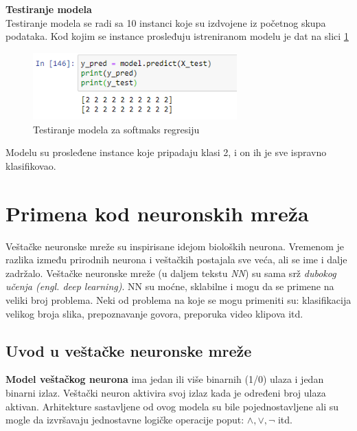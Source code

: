 \documentclass[a4paper,12pt]{report}
\begin{document}
\textbf{Testiranje modela}\\

Testiranje modela se radi sa 10 instanci koje su izdvojene iz početnog skupa podataka. Kod kojim se instance prosleđuju istreniranom modelu je dat na slici \ref{fig:softmaxtest}

\begin{figure}[h]
    \centering
    \includegraphics[width=0.7\textwidth]{softmax_test.png}
    \caption{Testiranje modela za softmaks regresiju}\label{fig:softmaxtest}
\end{figure}

Modelu su prosleđene instance koje pripadaju klasi 2, i on ih je sve ispravno klasifikovao. \\

\chapter{Primena kod neuronskih mreža}

Veštačke neuronske mreže su inspirisane idejom bioloških neurona. Vremenom je razlika između prirodnih neurona i veštačkih postajala sve veća, ali se ime i dalje zadržalo. Veštačke neuronske mreže (u daljem tekstu \textit{NN}) su sama srž \textit{dubokog učenja (engl. deep learning)}. NN su moćne, sklabilne i mogu da se primene na veliki broj problema. Neki od problema na koje se mogu primeniti su: klasifikacija velikog broja slika, prepoznavanje govora, preporuka video klipova itd. 

\section{Uvod u veštačke neuronske mreže}

\textbf{Model veštačkog neurona} ima jedan ili više binarnih (1/0) ulaza i jedan binarni izlaz. Veštački neuron aktivira svoj izlaz kada je određeni broj ulaza aktivan. Arhitekture sastavljene od ovog modela su bile pojednostavljene ali su mogle da izvršavaju jednostavne logičke operacije poput: \textit{$\wedge, \lor, \neg$} itd. \\
\end{document}
